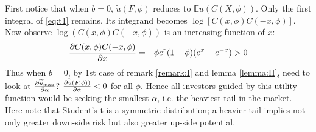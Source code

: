 \documentclass[11pt,a4]{amsart}
\newcommand{\pd}{\partial}
\newcommand{\red}{\color{darkred}}
\newcommand{\wt}{\widetilde}
\newcommand{\E }{{\mathbb E}}
\newcommand{\1}{{\mathbf 1}}
\begin{document}
First notice that when $b = 0$, $\wt u(F, \phi)$ reduces to
$\E u(C(X, \phi))$. Only the first integral of \eqref{eq:t1} remains.
Its integrand becomes $\log[C(x, \phi) C(-x, \phi)]$.
Now observe $\log(C(x, \phi)C(-x, \phi))$ is an increasing function of
$x$:
\begin{eqnarray*}
  {\pd C(x, \phi) C(-x, \phi) \over \pd x}
  &=&
  \phi e^r (1 - \phi) (e^x - e^{-x}) > 0
\end{eqnarray*}
Thus when $b = 0$, by 1st case of remark \ref{remark:I} and lemma
\ref{lemma:II}, {\red need to look at $\pd \wt u_{\rm max} \over \pd \alpha$?} 
${\pd \wt u(F, \phi)) \over \pd \alpha} < 0$ for all $\phi$. Hence all
investors guided by this utility function would be seeking the
smallest $\alpha$, i.e. the heaviest tail in the market. Here note that
Student's t is a symmetric distribution; a heavier tail implies not
only greater down-side risk but also greater up-side potential.
\end{document}
